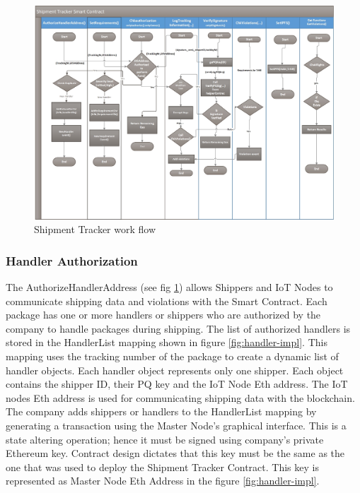 \clearpage   
\begin{figure}[h]
	\centering
    \includegraphics[width=175mm,scale=1]{figs/sc-workflow}
	\caption{Shipment Tracker work flow}
	\label{fig:sc-workflow} 
\end{figure}
\vspace{0.5cm}

\subsubsection{Handler Authorization} \label{AuthHandlers}
The AuthorizeHandlerAddress (see fig \ref{fig:sc-workflow}) allows Shippers and IoT Nodes to communicate shipping data and violations with the Smart Contract. Each package has one or more handlers or shippers who are authorized by the company to handle packages during shipping. The list of authorized handlers is stored in the HandlerList mapping shown in figure \ref{fig:handler-impl}. This mapping uses the tracking number of the package to create a dynamic list of handler objects. Each handler object represents only one shipper. Each object contains the shipper ID, their PQ key and the IoT Node Eth address. The IoT nodes Eth address is used for communicating shipping data with the blockchain. The company adds shippers or handlers to the HandlerList mapping by generating a transaction using the Master Node’s graphical interface. This is a state altering operation; hence it must be signed using company’s private Ethereum key. Contract design dictates that this key must be the same as the one that was used to deploy the Shipment Tracker Contract. This key is represented as Master Node Eth Address in the figure \ref{fig:handler-impl}. 
\clearpage


